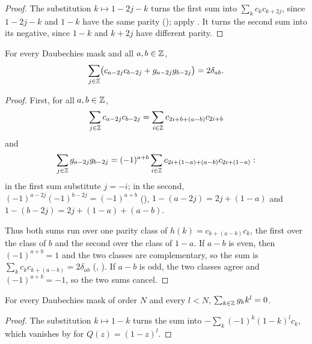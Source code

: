 \begin{proof}
\leanok
{}
The substitution $k \mapsto 1 - 2j - k$ turns the first sum into $\sum_k c_k c_{k+2j}$, since
$1 - 2j - k$ and $1 - k$ have the same parity (); apply
. It turns the second sum into its negative, since $1 - k$ and
$k + 2j$ have different parity.
\end{proof}

\begin{theorem}
\label{thm:daub-filter-identity}
\leanok
{}
For every Daubechies mask and all $a, b \in \mathbb{Z}$,
\[
  \sum_{j \in \mathbb{Z}} \bigl(c_{a-2j} c_{b-2j} + g_{a-2j} g_{b-2j}\bigr) = 2 \delta_{ab} .
\]
\end{theorem}

\begin{proof}
\leanok
{}
First, for all $a, b \in \mathbb{Z}$,
\[
  \sum_{j \in \mathbb{Z}} c_{a-2j} c_{b-2j} = \sum_{i \in \mathbb{Z}} c_{2i+b+(a-b)} c_{2i+b}
\]
and
\[
  \sum_{j \in \mathbb{Z}} g_{a-2j} g_{b-2j}
  = (-1)^{a+b} \sum_{i \in \mathbb{Z}} c_{2i+(1-a)+(a-b)} c_{2i+(1-a)} :
\]
in the first sum substitute $j = -i$; in the second,
$(-1)^{a-2j} (-1)^{b-2j} = (-1)^{a+b}$ (),
$1 - (a - 2j) = 2j + (1 - a)$ and $1 - (b - 2j) = 2j + (1 - a) + (a - b)$.

Thus both sums run over one parity class of $h(k) = c_{k+(a-b)} c_k$, the first over the class
of $b$ and the second over the class of $1 - a$. If $a - b$ is even, then $(-1)^{a+b} = 1$ and
the two classes are complementary, so the sum is $\sum_k c_k c_{k+(a-b)} = 2 \delta_{ab}$
(, ). If $a - b$ is odd, the two
classes agree and $(-1)^{a+b} = -1$, so the two sums cancel.
\end{proof}

\begin{proposition}
\label{prop:daub-dual-moments}
\leanok
{}
For every Daubechies mask of order $N$ and every $l < N$, $\sum_{k \in \mathbb{Z}} g_k k^l = 0$.
\end{proposition}

\begin{proof}
\leanok
{}
The substitution $k \mapsto 1 - k$ turns the sum into $-\sum_k (-1)^k (1 - k)^l c_k$, which
vanishes by  for $Q(z) = (1 - z)^l$.
\end{proof}

